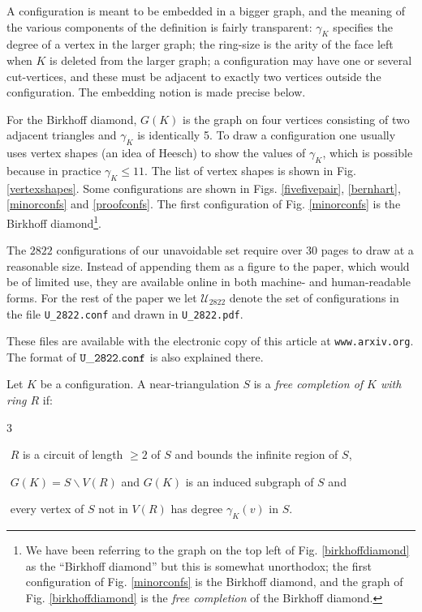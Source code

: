 \documentclass[11pt]{article}
\newcommand{\mcal}{\mathcal}
\newcommand{\back}{\backslash}
\newcommand{\nc}{{$2822$ }}
\newcommand{\ncmath}{2822}
\newcommand{\gm}{\gamma}
\newcommand{\arxurl}{{\tt www.arxiv.org}}
\newif\ifarxiv
\begin{document}
\noindent 
A configuration is meant to be embedded in a bigger graph, and the meaning of the various components of the definition is fairly transparent: $\gm_K$ specifies the degree of a vertex in the larger graph; the ring-size is the arity of the face left when $K$ is deleted from the larger graph; a configuration may have one or several cut-vertices, and these must be adjacent to exactly two vertices outside the configuration. The embedding notion is made precise below.

For the Birkhoff diamond, $G(K)$ is the graph on four vertices consisting of two adjacent triangles and $\gamma_K$ is identically 5. To draw a configuration one usually uses vertex shapes (an idea of Heesch) to show the values of $\gamma_K$, which is possible because in practice $\gamma_K \leq 11$. The list of vertex shapes is shown in Fig$.$ \ref{vertexshapes}. Some configurations are shown in Figs$.$ \ref{fivefivepair}, \ref{bernhart}, \ref{minorconfs} and \ref{proofconfs}. The first configuration of Fig$.$ \ref{minorconfs} is the Birkhoff diamond\footnote{We have been referring to the graph on the top left of Fig$.$ \ref{birkhoffdiamond} as the ``Birkhoff diamond'' but this is somewhat unorthodox; the first configuration of Fig$.$ \ref{minorconfs} is the Birkhoff diamond, and the graph of Fig$.$ \ref{birkhoffdiamond} is the \emph{free completion} of the Birkhoff diamond.}. 

\vertexshapesfig

The \nc configurations of our unavoidable set require over 30 pages to draw at a reasonable size. Instead of appending them as a figure to the paper, which would be of limited use, they are available online in both machine- and human-readable forms. For the rest of the paper we let $\mcal{U}_{\ncmath}$ denote the set of configurations in the file {\tt U\_{\ncmath}.conf} and drawn in {\tt U\_{\ncmath}.pdf}. 
\ifarxiv
The format of ${\tt U\_\ncmath.conf}$ is explained in the `README' file.
\else
These files are available with the electronic copy of this article at \arxurl. 
The format of ${\tt U\_\ncmath.conf}$ is also explained there.
\fi

Let $K$ be a configuration. A near-triangulation $S$ is a \emph{free completion of $K$ with ring $R$} if:

	  {
	  \renewcommand{\theenumi}{\arabic{enumi}}
	  \renewcommand{\labelenumi}{(\theenumi)}
	  \begin{list}{3}{
	    \setlength{\itemindent}{44pt}
	    \setlength{\itemsep}{0pt}
	    \setlength{\parskip}{-5pt}
            \setlength{\leftmargin}{0pt}}

\item[(i)\hfill] $\!\!\!\!\!$ $R$ is a circuit of length $\geq 2$ of $S$ and bounds the infinite region of $S$,

\item[(ii)\hfill] $\!\!\!\!\!$ $G(K) = S \back V(R)$ and $G(K)$ is an induced subgraph of $S$ and

\item[(iii)\hfill] $\!\!\!\!\!$ every vertex of $S$ not in $V(R)$ has degree $\gm_K(v)$ in $S$.
\end{list}
}
\end{document}
